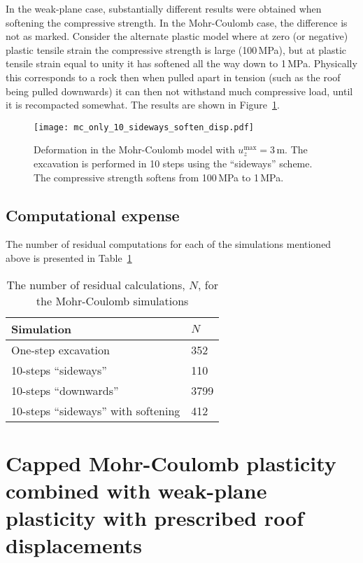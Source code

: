 \documentclass[]{scrreprt}
\begin{document}
In the weak-plane case, substantially different results were obtained
when softening the compressive strength.  In the Mohr-Coulomb case,
the difference is not as marked.  Consider the alternate plastic model
where at zero (or negative) plastic tensile strain the compressive strength
is large (100\,MPa), but at plastic tensile strain equal to unity it
has softened all the way down to 1\,MPa.  Physically this corresponds
to a rock then when pulled apart in tension (such as the roof being
pulled downwards) it can then not withstand much compressive load,
until it is recompacted somewhat.  The results are shown in Figure~\ref{mc.10_sideways_soften_soften}.

\begin{figure}[htb]
\begin{center}
\texttt{[image: mc\_only\_10\_sideways\_soften\_disp.pdf]}
\caption{Deformation in the Mohr-Coulomb model with
  $u_{z}^{\mathrm{max}} = 3$\,m.  The excavation is performed in 10
  steps using the ``sideways'' scheme.  The compressive strength
  softens from 100\,MPa to 1\,MPa.}
\label{mc.10_sideways_soften_soften}
\end{center}
\end{figure}

\section{Computational expense}

The number of residual computations for each of the simulations
mentioned above is presented in Table~\ref{mc.n}

\begin{table}[htb]
\begin{center}
\begin{tabular}{ll}
Simulation & $N$ \\
\hline
One-step excavation & 352 \\
10-steps ``sideways'' & 110 \\
10-steps ``downwards'' & 3799 \\
10-steps ``sideways'' with softening & 412
\end{tabular}
\caption{The number of residual calculations, $N$, for the Mohr-Coulomb
  simulations}
\label{mc.n}
\end{center}
\end{table}

\chapter{Capped Mohr-Coulomb plasticity combined with weak-plane
  plasticity with prescribed roof displacements}
\end{document}
